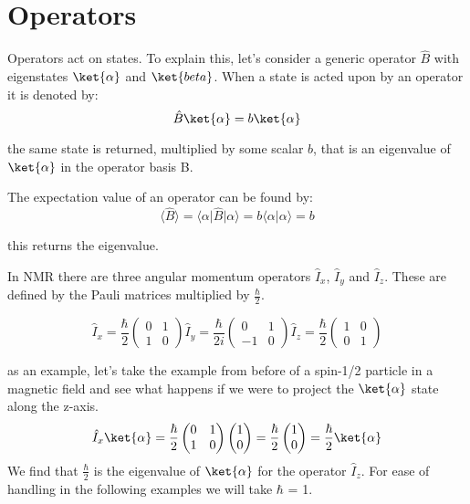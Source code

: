 \section{Operators}

Operators act on states. To explain this, let's consider a generic operator $\hat{B}$ with eigenstates $\ket{\alpha}$ and $\ket{beta}$. When a state is acted upon by an operator it is denoted by:
\begin{equation}
  \hat{B}\ket{\alpha} = b\ket{\alpha}
\end{equation}

the same state is returned, multiplied by some scalar $b$, that is an eigenvalue of $\ket{\alpha}$
in the operator basis B.

The expectation value of an operator can be found by:
\begin{equation}\label{eqn:expectation}
  \langle\hat{B}\rangle = \langle\alpha\vert\hat{B}\vert\alpha\rangle = b\langle\alpha\vert\alpha\rangle = b
\end{equation}

this returns the eigenvalue.

In NMR there are three angular momentum operators $\hat{I}_x$, $\hat{I}_y$ and $\hat{I}_z$. These are defined by the Pauli matrices multiplied by $\frac{\hbar}{2}$.

\begin{equation}
  \hat{I}_x=\frac{\hbar}{2}\begin{pmatrix}
    0 & 1\\
    1 & 0
\end{pmatrix}
\hat{I}_y=\frac{\hbar}{2i}\begin{pmatrix}
  0 & 1\\
  -1 & 0
\end{pmatrix}
\hat{I}_z=\frac{\hbar}{2}\begin{pmatrix}
  1 & 0\\
  0 & 1
\end{pmatrix}
\end{equation}

as an example, let's take the example from before of a spin-1/2 particle in a magnetic field
and see what happens if we were to project the $\ket{\alpha}$ state along the z-axis.
\begin{equation}\label{eqn:operators}
  \hat{I}_x\ket{\alpha} = \frac{\hbar}{2}\begin{pmatrix}
    0 & 1\\
    1 & 0
\end{pmatrix}
\begin{pmatrix}
  1\\
  0
\end{pmatrix} = \frac{\hbar}{2}\begin{pmatrix}
  1\\
  0
\end{pmatrix} = \frac{\hbar}{2}\ket{\alpha}
\end{equation}
We find that $\frac{\hbar}{2}$ is the eigenvalue of $\ket{\alpha}$ for the operator $\hat{I}_z$. For ease of handling in the following examples we will take $\hbar$ = 1.

